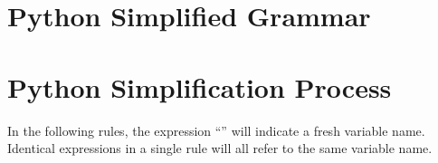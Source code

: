 \documentclass{article}
\begin{document}
  \section{Python Simplified Grammar}

  \begin{grammar}
    \grule[variables]{\pvariable}{}
    \grule[suites]{\psuite}{\gtobrk \pstmt; \ldots \gtcbrk}
    \grule[statements]{\pstmt}{
                \gtreturn \pexpr \gline
        \gor    \pvariable \gteq \pexpr \gline
        \gor    \gtwhile \pvariable \gtcolon \psuite \gline
        \gor    \gtif \pexpr \gtcolon \psuite \gtelse \gtcolon \psuite \gline
        \gor    \gtraise \pexpr \gline
        \gor    \gttry \gtcolon \psuite \gtexcept \pvariable \gtcolon \psuite \gline
        \gor    \gtpass \gline
        \gor    \gtbreak \gline
        \gor    \gtcontinue \gline
        \gor    \pexpr \gline
    }
    \grule[numbers]{\pnum}{}
  \end{grammar}

\section{Python Simplification Process}

In the following rules, the expression ``\tfreshvar'' will indicate a fresh variable name.
Identical expressions in a single rule will all refer to the same variable name.
\end{document}
